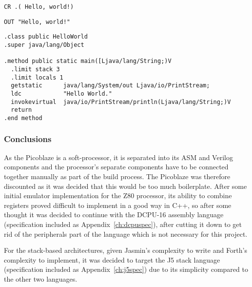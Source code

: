 \noindent\begin{minipage}{0.5\textwidth}
\begin{lstlisting}[caption={Forth ASM},label={lst:forthasm}]
CR .( Hello, world!)
\end{lstlisting}
\end{minipage}%
\noindent\begin{minipage}{0.5\textwidth}
\begin{lstlisting}[caption={J5 ASM},label={lst:j5asm}]
OUT "Hello, world!"
\end{lstlisting}
\end{minipage}

\noindent\begin{minipage}{\linewidth}
\begin{lstlisting}[caption={Jasmin ASM}, label={lst:jasminasm}]
.class public HelloWorld
.super java/lang/Object

.method public static main([Ljava/lang/String;)V
  .limit stack 3
  .limit locals 1
  getstatic      java/lang/System/out Ljava/io/PrintStream;
  ldc            "Hello World."
  invokevirtual  java/io/PrintStream/println(Ljava/lang/String;)V
  return
.end method
\end{lstlisting}
\end{minipage}

\subsubsection{Conclusions}

As the Picoblaze is a soft-processor, it is separated into its ASM and Verilog
components and the processor's separate components have to be connected together
manually as part of the build process. The Picoblaze was therefore discounted as
it was decided that this would be too much boilerplate.  After some initial
emulator implementation for the Z80 processor, its ability to combine registers
proved difficult to implement in a good way in C++, so after some thought it was
decided to continue with the DCPU-16 assembly language (specification included
as Appendix~\ref{ch:dcpuspec}), after cutting it down to get rid of the
peripherals part of the language which is not necessary for this project.

For the stack-based architectures, given Jasmin's complexity to write and
Forth's complexity to implement, it was decided to target the J5 stack language
(specification included as Appendix~\ref{ch:j5spec}) due to its simplicity
compared to the other two languages.
